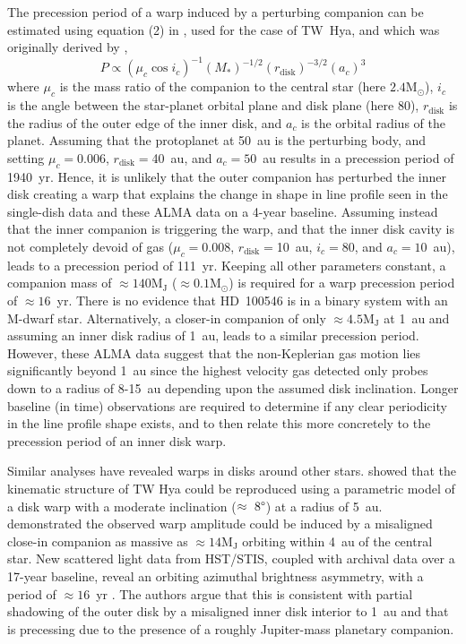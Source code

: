 \documentclass[onecolumn]{aastex6}
\begin{document}
The precession period of a warp induced by a perturbing companion can be
estimated  using equation (2) in \citet{debes17}, used for the case of TW~Hya,
and which was originally derived by \citet{lai14},   \begin{equation} P \propto
(\mu_c \cos i_c)^{-1}(M_\ast)^{-1/2}(r_\mathrm{disk})^{-3/2}(a_c)^{3}
\end{equation} where $\mu_c$ is the mass ratio of the companion to the central
star (here $2.4 \mathrm{M}_\odot$),  $i_c$ is the angle between the star-planet
orbital plane  and disk plane (here 80\degree),  $r_\mathrm{disk}$ is the radius
of the outer edge of the inner disk, and  $a_c$ is the orbital radius of the
planet. Assuming that the  protoplanet at 50~au is the perturbing body, and
setting $\mu_c = 0.006$, $r_\mathrm{disk} = $40~au, and $a_c=50$~au results in
a precession period of 1940~yr.   Hence, it is unlikely that the outer companion
has  perturbed the inner disk creating a warp that explains  the change in shape
in line profile seen in the single-dish data and these ALMA data on a 4-year
baseline.   Assuming instead that the inner companion is triggering the  warp,
and that the inner disk cavity is not completely devoid of gas  ($\mu_c =
0.008$, $r_\mathrm{disk} = $10~au, $i_c = 80$\degree, and  $a_c=10$~au), leads
to a precession period of 111~yr.  Keeping all other parameters constant, a
companion mass of  $\approx 140 \mathrm{M}_\mathrm{J}$ ($\approx 0.1
\mathrm{M}_\odot$) is required for  a warp precession period of $\approx 16$~yr.
There is no evidence that HD~100546 is in  a binary system with an M-dwarf star.
Alternatively, a closer-in companion of only  $\approx 4.5
\mathrm{M}_\mathrm{J}$ at 1~au and assuming an inner disk radius of 1~au,  leads
to a similar precession period. However, these ALMA data suggest that the
non-Keplerian gas motion lies significantly beyond  1~au since the highest
velocity gas detected only probes down to a radius of 8-15~au depending  upon
the assumed disk inclination.   Longer baseline (in time) observations are
required to determine if any  clear periodicity in the line profile shape
exists, and to then  relate this more concretely to the precession period of an
inner disk warp.  

Similar analyses have revealed warps in disks around other stars.  
\citet{rosenfeld12} showed that the kinematic structure of TW Hya 
could be reproduced using a parametric model of a disk warp 
with a moderate inclination ($\approx~8\degree$) at a radius of 5~au.  
\citet{facchini14} demonstrated the observed warp amplitude  
could be induced by a misaligned close-in companion as massive as 
$\approx 14 \mathrm{M}_\mathrm{J}$ orbiting within 4~au of the central star.  
New scattered light data from HST/STIS, coupled with 
archival data over a 17-year baseline, reveal an orbiting 
azimuthal brightness asymmetry, with a 
period of $\approx 16$~yr \citep{debes17}.  
The authors argue that this is consistent with partial 
shadowing of the outer disk by a misaligned inner 
disk interior to 1~au and that is precessing due to 
the presence of a roughly Jupiter-mass planetary companion.  
\end{document}
